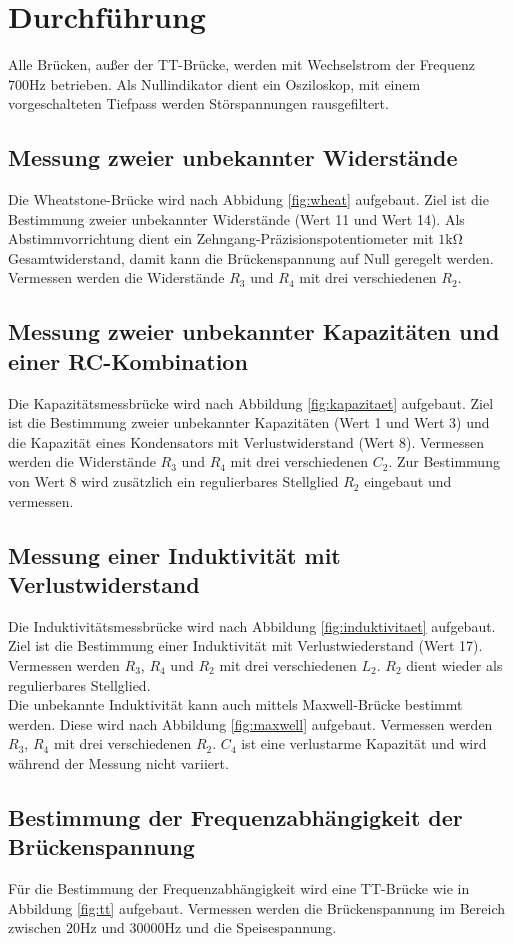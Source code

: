 \section{Durchführung}
\label{sec:Durchführung}
Alle Brücken, außer der TT-Brücke, werden mit Wechselstrom der Frequenz $700\si{\hertz}$ betrieben.
Als Nullindikator dient ein Osziloskop, mit einem vorgeschalteten Tiefpass werden Störspannungen rausgefiltert.
\subsection{Messung zweier unbekannter Widerstände}
Die Wheatstone-Brücke wird nach Abbidung \ref{fig:wheat} aufgebaut. Ziel ist die Bestimmung zweier unbekannter Widerstände (Wert 11 und Wert 14).
Als Abstimmvorrichtung dient ein Zehngang-Präzisionspotentiometer mit $1\si{\kilo\ohm}$ Gesamtwiderstand, damit kann die Brückenspannung auf Null geregelt werden.
Vermessen werden die Widerstände $R_\mathrm{3}$ und $R_\mathrm{4}$ mit drei verschiedenen $R_\mathrm{2}$.
\subsection{Messung zweier unbekannter Kapazitäten und einer RC-Kombination}
Die Kapazitätsmessbrücke wird nach Abbildung \ref{fig:kapazitaet} aufgebaut.
Ziel ist die Bestimmung zweier unbekannter Kapazitäten (Wert 1 und Wert 3) und die Kapazität eines Kondensators mit Verlustwiderstand (Wert 8).
Vermessen werden die Widerstände $R_\mathrm{3}$ und $R_\mathrm{4}$ mit drei verschiedenen $C_\mathrm{2}$.
Zur Bestimmung von Wert 8 wird zusätzlich ein regulierbares Stellglied $R_\mathrm{2}$ eingebaut und vermessen.
\subsection{Messung einer Induktivität mit Verlustwiderstand}
Die Induktivitätsmessbrücke wird nach Abbildung \ref{fig:induktivitaet} aufgebaut.
Ziel ist die Bestimmung einer Induktivität mit Verlustwiederstand (Wert 17).
Vermessen werden $R_\mathrm{3}$, $R_\mathrm{4}$ und $R_\mathrm{2}$ mit drei verschiedenen $L_\mathrm{2}$.
$R_\mathrm{2}$ dient wieder als regulierbares Stellglied.\\
Die unbekannte Induktivität kann auch mittels Maxwell-Brücke bestimmt werden.
Diese wird nach Abbildung \ref{fig:maxwell} aufgebaut.
Vermessen werden $R_\mathrm{3}$, $R_\mathrm{4}$ mit drei verschiedenen $R_\mathrm{2}$.
$C_\mathrm{4}$ ist eine verlustarme Kapazität und wird während der Messung nicht variiert.
\subsection{Bestimmung der Frequenzabhängigkeit der Brückenspannung}
Für die Bestimmung der Frequenzabhängigkeit wird eine TT-Brücke wie in Abbildung \ref{fig:tt}
aufgebaut. Vermessen werden die Brückenspannung im Bereich zwischen $20\si{\hertz}$ und $30000\si{\hertz}$ und die Speisespannung.
